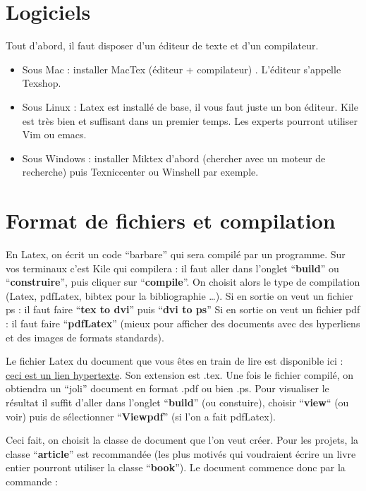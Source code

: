 \section{Logiciels}
Tout d'abord, il faut disposer d'un éditeur de texte et d'un compilateur.

\begin{itemize}
\item Sous Mac : installer MacTex  (éditeur + compilateur) . L'éditeur s'appelle Texshop.  
\item Sous Linux : Latex est installé de base, il vous faut juste un bon éditeur. Kile est très
 bien et suffisant
dans un premier temps. Les experts pourront utiliser Vim ou emacs. 
\item Sous Windows : installer Miktex d'abord (chercher avec un moteur de recherche) puis Texniccenter 
ou  Winshell par exemple.
\end{itemize}


\section{Format de fichiers et compilation}
En Latex, on écrit un code ``barbare'' qui sera compil\'e par un programme. Sur vos terminaux c'est Kile 
qui compilera : il faut aller dans l'onglet ``\textbf{build}'' ou ``\textbf{construire}'', puis cliquer 
sur ``\textbf{compile}''. On choisit alors le type de compilation (Latex, pdfLatex, bibtex pour la
 bibliographie \ldots). 
Si en sortie on veut un fichier ps : il faut faire ``\textbf{tex to dvi}'' puis  ``\textbf{dvi to ps}''
Si en sortie on veut un fichier pdf : il faut faire ``\textbf{pdfLatex}'' (mieux pour afficher des documents 
avec des hyperliens et des images de formats standards).

Le fichier Latex du document que vous êtes en train de lire est  disponible ici : 
\href{http://josephsalmon.eu/enseignement/M1/introlatex.tex}{ceci est un lien hypertexte}.  
Son extension est  .tex. Une fois le fichier compilé,  on obtiendra un ``joli'' document en format .pdf 
ou bien .ps. Pour visualiser le résultat il suffit d'aller dans l'onglet  ``\textbf{build}'' 
(ou constuire), choisir ``\textbf{view}`` (ou voir) puis de sélectionner ``\textbf{Viewpdf}'' 
(si l'on a fait pdfLatex).\medskip

Ceci fait, on choisit la classe de document  que l'on veut créer.  Pour les projets,  
la classe ``\textbf{article}'' est recommandée (les plus motivés qui voudraient écrire un 
livre entier pourront utiliser la classe ``\textbf{book}''). Le document commence donc par la 
commande :\medskip

